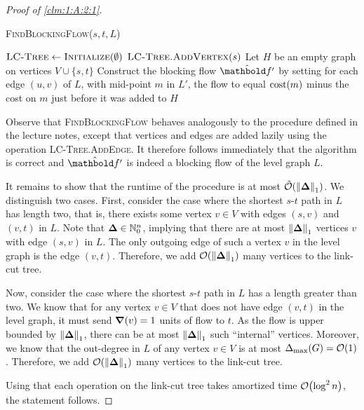 \documentclass{tufte-handout}
\begin{document}
\begin{proof}[Proof of \cref{clm:1:A:2:1}]
\begin{algorithm}
    \caption{\textsc{FindBlockingFlow($s, t, L$)}}\label{alg:1:A:1}
    $\textsc{LC-Tree} \gets \textsc{Initialize}(\emptyset)$\;
    $\textsc{LC-Tree.AddVertex}(s)$\;
    Let $H$ be an empty graph on vertices $V \cup \{s,t\}$\;
    Construct the blocking flow $\hat{\vf'}$ by setting for each edge $(u,v)$ of $L$, with mid-point $m$ in $L'$, the flow to equal $\mathrm{cost}(m)$ minus the cost on $m$ just before it was added to $H$\;
\end{algorithm}

Observe that \textsc{FindBlockingFlow} behaves analogously to the procedure defined in the lecture notes, except that vertices and edges are added lazily using the operation \textsc{LC-Tree.AddEdge}. It therefore follows immediately that the algorithm is correct and $\hat{\vf'}$ is indeed a blocking flow of the level graph $L$.

It remains to show that the runtime of the procedure is at most $\TildeLandauO{\norm{\vDelta}_1}$. We distinguish two cases. First, consider the case where the shortest $s$-$t$ path in $L$ has length two, that is, there exists some vertex $v \in V$ with edges $(s,v)$ and $(v,t)$ in $L$. Note that $\vDelta \in \Nat_0^n$, implying that there are at most $\norm{\vDelta}_1$ vertices $v$ with edge $(s,v)$ in $L$. The only outgoing edge of such a vertex $v$ in the level graph is the edge $(v,t)$. Therefore, we add $\LandauO{\norm{\vDelta}_1}$ many vertices to the link-cut tree.

Now, consider the case where the shortest $s$-$t$ path in $L$ has a length greater than two. We know that for any vertex $v \in V$ that does not have edge $(v,t)$ in the level graph, it must send $\boldsymbol{\nabla}(v) = 1$ units of flow to $t$. As the flow is upper bounded by $\norm{\vDelta}_1$, there can be at most $\norm{\vDelta}_1$ such ``internal'' vertices. Moreover, we know that the out-degree in $L$ of any vertex $v \in V$ is at most $\Delta_{\max}(G) = \LandauO{1}$. Therefore, we add $\LandauO{\norm{\vDelta}_1}$ many vertices to the link-cut tree.

Using that each operation on the link-cut tree takes amortized time $\LandauO{\log^2 n}$, the statement follows.
\end{proof}
\end{document}
